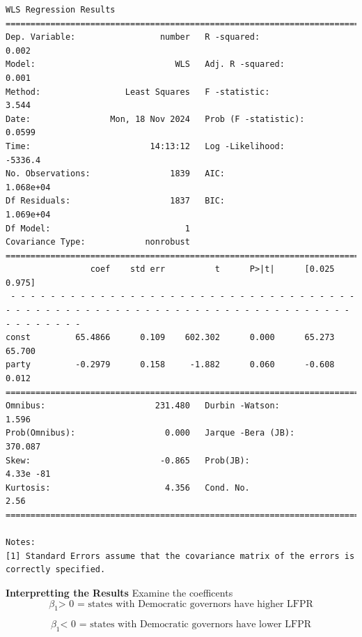 \begin{verbatim}
WLS Regression Results                            
==============================================================================
Dep. Variable:                 number   R -squared:                       0.002
Model:                            WLS   Adj. R -squared:                  0.001
Method:                 Least Squares   F -statistic:                     3.544
Date:                Mon, 18 Nov 2024   Prob (F -statistic):             0.0599
Time:                        14:13:12   Log -Likelihood:                -5336.4
No. Observations:                1839   AIC:                         1.068e+04
Df Residuals:                    1837   BIC:                         1.069e+04
Df Model:                           1                                         
Covariance Type:            nonrobust                                         
==============================================================================
                 coef    std err          t      P>|t|      [0.025      0.975]
 - - - - - - - - - - - - - - - - - - - - - - - - - - - - - - - - - - - - - - - - - - - - - - - - - - - - - - - - - - - - - - - - - - - - - - - - - - - - - -
const         65.4866      0.109    602.302      0.000      65.273      65.700
party         -0.2979      0.158     -1.882      0.060      -0.608       0.012
==============================================================================
Omnibus:                      231.480   Durbin -Watson:                   1.596
Prob(Omnibus):                  0.000   Jarque -Bera (JB):              370.087
Skew:                          -0.865   Prob(JB):                     4.33e -81
Kurtosis:                       4.356   Cond. No.                         2.56
==============================================================================

Notes:
[1] Standard Errors assume that the covariance matrix of the errors is correctly specified.
\end{verbatim}

\textbf{Interpretting the Results}
Examine the coefficents
\begin{equation}

\beta_1 \text{> 0 = states with Democratic governors have higher LFPR}
\end{equation}

\begin{equation}
\beta_1 \text{< 0 = states with Democratic governors have lower LFPR}
\end{equation}


